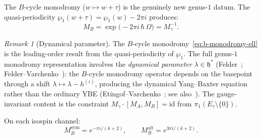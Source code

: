 \documentclass[11pt,reqno]{amsart}
\theoremstyle{definition}
\theoremstyle{remark}
\newtheorem{remark}[theorem]{Remark}
\newcommand{\fh}{\mathfrak{h}}
\newcommand{\id}{\mathrm{id}}
\numberwithin{equation}{section}
\begin{document}
The $B$-cycle monodromy ($w \mapsto w + \tau$) is the
genuinely new genus-$1$ datum.
The quasi-periodicity $\wp_1(w + \tau) = \wp_1(w) - 2\pi i$
produces:
\begin{equation}\label{eq:b-monodromy-ell}
  M_B
  = \exp\!\bigl(-2\pi i\,\hbar\,\Omega\bigr)
  = M_\gamma^{-1}.
\end{equation}
\begin{remark}[Dynamical parameter]
\label{rem:dynamical-parameter}
The $B$-cycle monodromy~\eqref{eq:b-monodromy-ell}
is the leading-order result from the quasi-periodicity
of $\wp_1$. The full genus-$1$ monodromy representation
involves the \emph{dynamical parameter}
$\lambda \in \fh^*$ \textup{(}Felder~\cite{Felder94};
Felder--Varchenko~\cite{FelderVarchenko96}\textup{)}: the
$B$-cycle monodromy operator depends on the basepoint
through a shift $\lambda \mapsto \lambda - h^{(i)}$,
producing the dynamical Yang--Baxter equation rather than
the ordinary YBE
\textup{(}Etingof--Varchenko~\cite{EV98};
see also~\cite[Thm~5.6]{Lorgat26I}\textup{)}.
The gauge-invariant content is the constraint
$M_\gamma \cdot [M_A, M_B] = \id$
from $\pi_1(E_\tau \setminus \{0\})$.
\end{remark}
On each isospin channel:
\begin{equation}\label{eq:b-monodromy-channels}
  M_B^{\mathrm{sym}} = e^{-\pi i/(k+2)}, \qquad
  M_B^{\mathrm{alt}} = e^{3\pi i/(k+2)}.
\end{equation}
\end{document}
